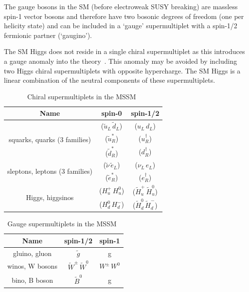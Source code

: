 The gauge bosons in the SM (before electroweak SUSY breaking) are massless spin-1 vector bosons
and therefore have two bosonic degrees of freedom (one per helicity state) and
can be included in a `gauge' supermultiplet with a spin-1/2 fermionic partner (`gaugino').

The SM Higgs does not reside in a single chiral supermultiplet as this introduces
a gauge anomaly into the theory~\cite{SUSYP}. This anomaly may be avoided by including two Higgs 
chiral supermultiplets with opposite hypercharge. The SM Higgs is a linear combination of the neutral components 
of these supermultiplets.

\begin{table}[!h]
  \centering
  \caption{Chiral supermultiplets in the MSSM~\cite{SUSYP}}
  \label{tab:chiral}
  \begin{tabular}
    {ccc}
    \hline\hline
    Name& spin-0 & spin-1/2 \\
    \hline
    \multirow{3}{*}{squarks, quarks (3 families) }& ($\tilde{u}_L\,\tilde{d}_L$) & ($u_L\,d_L$) \\
    & ($\tilde{u}^{*}_R$) & ($u_R^{\dagger}$) \\
    & ($\tilde{d}^{*}_R$) & ($d_R^{\dagger}$) \\
    \hline
    \multirow{2}{*}{sleptons, leptons (3 families) }& ($\tilde{\nu}\,\tilde{e}_L$) & ($\nu_L\,e_L$) \\
    & ($\tilde{e}^{*}_R$) & ($e_R^{\dagger}$) \\
    \hline
    \multirow{2}{*}{Higgs, higgsinos}& ($H_u^{+}\,H_u^{0}$) &  ($\tilde{H}_u^{+}\,\tilde{H}_u^{0}$) \\
    & ($H_d^{0}\,H_d^{-}$) &  ($\tilde{H}_d^{0}\,\tilde{H}_d^{-}$) \\
  \end{tabular}
\end{table}

\begin{table}[!h]
  \centering
  \caption{Gauge supermultiplets in the MSSM~\cite{SUSYP}}
  \label{tab:vector}
  \begin{tabular}
    {ccc}
    \hline\hline
    Name& spin-1/2 & spin-1 \\
    \hline
    gluino, gluon & $\tilde{g}$ & g \\
    winos, W bosons & $\tilde{W}^{\pm}\,\tilde{W}^0$ & $W^{\pm}\,W^{0}$ \\
    bino, B boson & $\tilde{B}^0$ & g \\
  \end{tabular}
\end{table}

